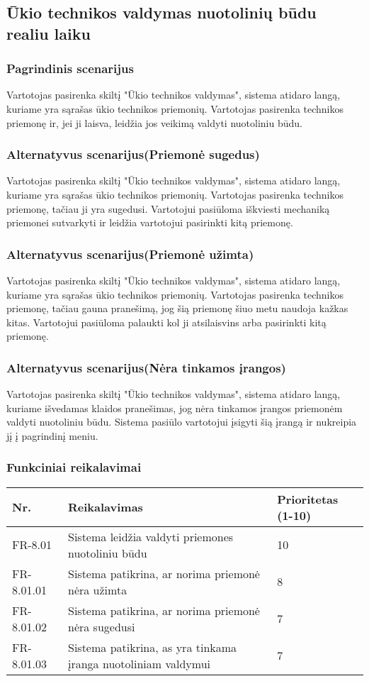 \documentclass[oneside]{VUMIFPSkursinis}
\begin{document}
\subsection{Ūkio technikos valdymas nuotolinių būdu realiu laiku}
\subsubsection{Pagrindinis scenarijus}
	Vartotojas pasirenka skiltį "Ūkio technikos valdymas", sistema atidaro langą, kuriame yra sąrašas ūkio technikos priemonių. Vartotojas pasirenka technikos priemonę ir, jei ji laisva, leidžia jos veikimą valdyti nuotoliniu būdu.
\subsubsection{Alternatyvus scenarijus(Priemonė sugedus)}
	Vartotojas pasirenka skiltį "Ūkio technikos valdymas", sistema atidaro langą, kuriame yra sąrašas ūkio technikos priemonių. Vartotojas pasirenka technikos priemonę, tačiau ji yra sugedusi. Vartotojui pasiūloma iškviesti mechaniką priemonei sutvarkyti ir leidžia vartotojui pasirinkti kitą priemonę.
\subsubsection{Alternatyvus scenarijus(Priemonė užimta)}
	Vartotojas pasirenka skiltį "Ūkio technikos valdymas", sistema atidaro langą, kuriame yra sąrašas ūkio technikos priemonių. Vartotojas pasirenka technikos priemonę, tačiau gauna pranešimą, jog šią priemonę šiuo metu naudoja kažkas kitas. Vartotojui pasiūloma palaukti kol ji atsilaisvins arba pasirinkti kitą priemonę.
\subsubsection{Alternatyvus scenarijus(Nėra tinkamos įrangos)}
	Vartotojas pasirenka skiltį "Ūkio technikos valdymas", sistema atidaro langą, kuriame išvedamas klaidos pranešimas, jog nėra tinkamos įrangos priemonėm valdyti nuotoliniu būdu. Sistema pasiūlo vartotojui įsigyti šią įrangą ir nukreipia jį į pagrindinį meniu.
\subsubsection{Funkciniai reikalavimai}
\begin{table}[htbp]
	\begin{tabularx}{1\textwidth}{ |P{2.5cm}|X|P{3cm }| }  \hline
           	Nr. & Reikalavimas &  Prioritetas (1-10)  \\   \hline 
         		FR-8.01 & Sistema leidžia valdyti priemones nuotoliniu būdu & 10  \\   \hline
		FR-8.01.01 & Sistema patikrina, ar norima priemonė nėra užimta & 8  \\ \hline
		FR-8.01.02 & Sistema patikrina, ar norima priemonė nėra sugedusi & 7 \\ \hline
		FR-8.01.03 & Sistema patikrina, as yra tinkama įranga nuotoliniam valdymui & 7 \\  \hline
	\end{tabularx}
\end{table}
\end{document}
